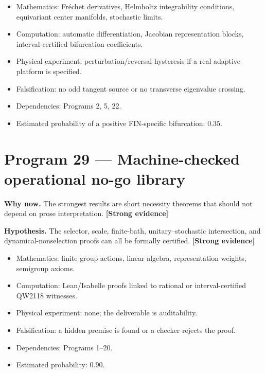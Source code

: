\documentclass[11pt,a4paper,openany]{report}
\newcommand{\statusStrong}{\textcolor{finblue}{[Strong evidence]}}
\begin{document}
\begin{itemize}
\item 
Mathematics: Fréchet derivatives, Helmholtz integrability conditions, equivariant center manifolds, stochastic limits.

\item 
Computation: automatic differentiation, Jacobian representation blocks, interval-certified bifurcation coefficients.

\item 
Physical experiment: perturbation/\allowbreak{}reversal hysteresis if a real adaptive platform is specified.

\item 
Falsification: no odd tangent source or no transverse eigenvalue crossing.

\item 
Dependencies: Programs 2, 5, 22.

\item 
Estimated probability of a positive FIN-specific bifurcation: \(0.35\).

\end{itemize}

\section{Program 29 — Machine-checked operational no-go library}

\textbf{Why now.} The strongest results are short necessity theorems that should not depend on prose interpretation. \textbf{\statusStrong{}}

\textbf{Hypothesis.} The selector, scale, finite-bath, unitary–stochastic intersection, and dynamical-nonselection proofs can all be formally certified. \textbf{\statusStrong{}}

\begin{itemize}
\item 
Mathematics: finite group actions, linear algebra, representation weights, semigroup axioms.

\item 
Computation: Lean/\allowbreak{}Isabelle proofs linked to rational or interval-certified QW2118 witnesses.

\item 
Physical experiment: none; the deliverable is auditability.

\item 
Falsification: a hidden premise is found or a checker rejects the proof.

\item 
Dependencies: Programs 1–20.

\item 
Estimated probability: \(0.90\).

\end{itemize}
\end{document}
